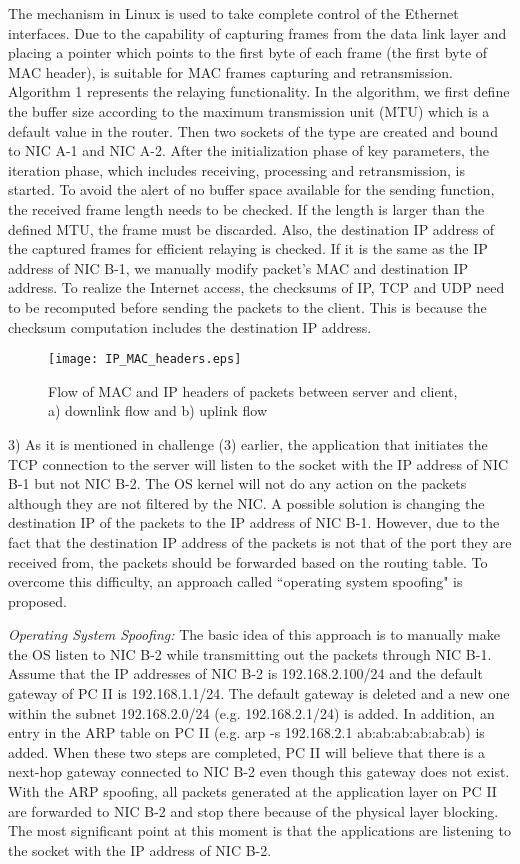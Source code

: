 \documentclass[10pt,journal]{IEEEtran}
\begin{document}
The  mechanism in Linux is used to take complete control of the Ethernet interfaces. Due to the capability of capturing frames from the data link layer and placing a pointer which points to the first byte of each frame (the first byte of MAC header),  is suitable for MAC frames capturing and retransmission. Algorithm 1 represents the relaying functionality. In the algorithm, we first define the buffer size according to the maximum transmission unit (MTU) which is a default value in the router. Then two sockets of the  type are created and bound to NIC A-1 and NIC A-2. After the initialization phase of key parameters, the iteration phase, which includes receiving, processing and retransmission, is started. To avoid the alert of no buffer space available for the sending function, the received frame length needs to be checked. If the length is larger than the defined MTU, the frame must be discarded. Also, the destination IP address of the captured frames for efficient relaying is checked. If it is the same as the IP address of NIC B-1, we manually modify packet's MAC and destination IP address. To realize the Internet access, the checksums of IP, TCP and UDP need to be recomputed before sending the packets to the client. This is because the checksum computation includes the destination IP address.

\begin{figure}
\centering
\texttt{[image: IP\_MAC\_headers.eps]}
\caption{Flow of MAC and IP headers of packets between server and client, a) downlink flow and b) uplink flow}
\label{fig_IP_MAC_headers}
\end{figure}

3) As it is mentioned in challenge (3) earlier, the application that initiates the TCP connection to the server will listen to the socket with the IP address of NIC B-1 but not NIC B-2. The OS kernel will not do any action on the packets although they are not filtered by the NIC. A possible solution is changing the destination IP of the packets to the IP address of NIC B-1. However, due to the fact that the destination IP address of the packets is not that of the port they are received from, the packets should be forwarded based on the routing table. To overcome this difficulty, an approach called ``operating system spoofing" is proposed.

{\it Operating System Spoofing:} The basic idea of this approach is to manually make the OS listen to NIC B-2 while transmitting out the packets through NIC B-1. Assume that the IP addresses of NIC B-2 is 192.168.2.100/24 and the default gateway of PC II is 192.168.1.1/24. The default gateway is deleted and a new one within the subnet 192.168.2.0/24 (e.g. 192.168.2.1/24) is added. In addition, an entry in the ARP table on PC II (e.g. arp -s 192.168.2.1 ab:ab:ab:ab:ab:ab) is added. When these two steps are completed, PC II will believe that there is a next-hop gateway connected to NIC B-2 even though this gateway does not exist. With the ARP spoofing, all packets generated at the application layer on PC II are forwarded to NIC B-2 and stop there because of the physical layer blocking. The most significant point at this moment is that the applications are listening to the socket with the IP address of NIC B-2.
\end{document}

